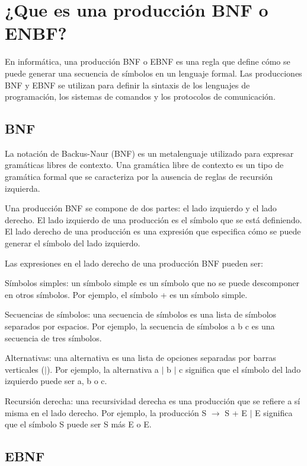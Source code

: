 \section{¿Que es una producción BNF o ENBF?}

En informática, una producción BNF o EBNF es una regla que define cómo se puede generar una secuencia de símbolos en un lenguaje formal. Las producciones BNF y EBNF se utilizan para definir la sintaxis de los lenguajes de programación, los sistemas de comandos y los protocolos de comunicación.

\subsection{BNF}

La notación de Backus-Naur (BNF) es un metalenguaje utilizado para expresar gramáticas libres de contexto. Una gramática libre de contexto es un tipo de gramática formal que se caracteriza por la ausencia de reglas de recursión izquierda.

Una producción BNF se compone de dos partes: el lado izquierdo y el lado derecho. El lado izquierdo de una producción es el símbolo que se está definiendo. El lado derecho de una producción es una expresión que especifica cómo se puede generar el símbolo del lado izquierdo.

Las expresiones en el lado derecho de una producción BNF pueden ser:

    Símbolos simples: un símbolo simple es un símbolo que no se puede descomponer en otros símbolos. Por ejemplo, el símbolo + es un símbolo simple.
    
    Secuencias de símbolos: una secuencia de símbolos es una lista de símbolos separados por espacios. Por ejemplo, la secuencia de símbolos a b c es una secuencia de tres símbolos.
    
    Alternativas: una alternativa es una lista de opciones separadas por barras verticales ($|$). Por ejemplo, la alternativa a $|$ b $|$ c significa que el símbolo del lado izquierdo puede ser a, b o c.
    
    Recursión derecha: una recursividad derecha es una producción que se refiere a sí misma en el lado derecho. Por ejemplo, la producción S $\xrightarrow{}$ S + E $|$ E significa que el símbolo S puede ser S más E o E.

\subsection{EBNF}

